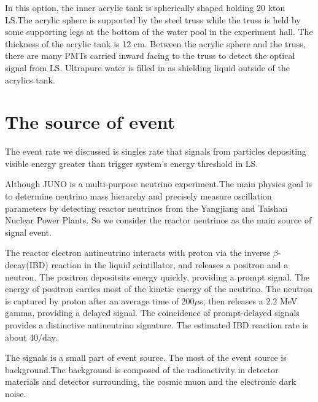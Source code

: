 \documentclass[a4paper,10pt,twoside]{paper}
\begin{document}
\begin{multicols}{2}
		In this option, the inner acrylic tank is spherically 
		shaped holding 20 kton LS.The acrylic sphere is supported 
		by the steel truss while the truss is held by some supporting 
		legs at the bottom of the water pool in the experiment hall. 
		The thickness of the acrylic tank is 12 cm. Between the 
		acrylic sphere and the truss, there are many PMTs carried 
		inward facing to the truss to detect the optical signal from LS.
		Ultrapure water is filled in as shielding liquid outside of the    		
		acrylics tank.	


		\section{The source of event }


		The event rate we discussed is singles rate that signals from
		particles depositing visible energy greater than trigger 
		system's energy threshold in LS.


		Although JUNO is a multi-purpose neutrino experiment.The main 
		physics
		goal is to determine neutrino mass hierarchy and precisely
		measure oscillation parameters by detecting reactor neutrinos 
		from the Yangjiang and Taishan Nuclear Power Plants. So we 
		consider the reactor neutrinos as the main source of signal event.


		The reactor electron antineutrino interacts with proton via 
		the inverse $\beta$-decay(IBD) reaction in the liquid 
		scintillator, and releases a positron and a neutron. 
		The positron depositsits energy quickly, providing a prompt 
		signal. The energy of positron carries most of the kinetic 
		energy of the neutrino.
		The neutron is captured by proton after an average time of 
		200$\mu$s, then releases a 2.2 MeV gamma, providing a delayed 
		signal. The coincidence of prompt-delayed signals provides a 
		distinctive antineutrino signature. The estimated IBD reaction 
		rate is about 40/day\cite{lab9}. 

		The signals is a small part of event source. The most of
		the event source is background.The background is composed of
		the radioactivity in detector materials and detector 
		surrounding, the cosmic muon and the electronic dark noise.


\end{multicols}
\end{document}
